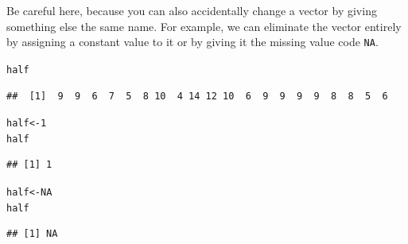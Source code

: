 \documentclass[12pt]{article}\usepackage[]{graphicx}\usepackage[]{color}
\makeatletter
\newcommand{\hlnum}[1]{\textcolor[rgb]{0.686,0.059,0.569}{#1}}%
\newcommand{\hlstd}[1]{\textcolor[rgb]{0.345,0.345,0.345}{#1}}%
\newcommand{\hlkwb}[1]{\textcolor[rgb]{0.69,0.353,0.396}{#1}}%
\newenvironment{kframe}{%
 \def\at@end@of@kframe{}%
 \ifinner\ifhmode%
  \def\at@end@of@kframe{\end{minipage}}%
  \begin{minipage}{\columnwidth}%
 \fi\fi%
 \def\FrameCommand##1{\hskip\@totalleftmargin \hskip-\fboxsep
 \colorbox{shadecolor}{##1}\hskip-\fboxsep
     \hskip-\linewidth \hskip-\@totalleftmargin \hskip\columnwidth}%
 \MakeFramed {\advance\hsize-\width
   \@totalleftmargin\z@ \linewidth\hsize
   \@setminipage}}%
 {\par\unskip\endMakeFramed%
 \at@end@of@kframe}
\newenvironment{knitrout}{}{} %
\makeatother
\begin{document}
Be careful here, because you can also accidentally change a vector by giving something else the same name. For example, we can eliminate the vector entirely by assigning a constant value to it or by giving it the missing value code \texttt{NA}.
\begin{knitrout}
\color{fgcolor}\begin{kframe}
\begin{alltt}
\hlstd{half}
\end{alltt}
\begin{verbatim}
##  [1]  9  9  6  7  5  8 10  4 14 12 10  6  9  9  9  9  8  8  5  6
\end{verbatim}
\begin{alltt}
\hlstd{half} \hlkwb{<-} \hlnum{1}
\hlstd{half}
\end{alltt}
\begin{verbatim}
## [1] 1
\end{verbatim}
\begin{alltt}
\hlstd{half} \hlkwb{<-} \hlnum{NA}
\hlstd{half}
\end{alltt}
\begin{verbatim}
## [1] NA
\end{verbatim}
\end{kframe}
\end{knitrout}
\end{document}
